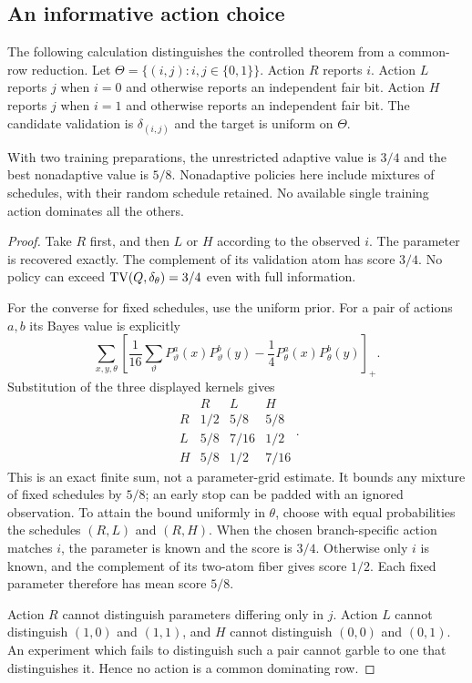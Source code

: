\subsection{An informative action choice}
The following calculation distinguishes the controlled theorem from a
common-row reduction. Let $\Theta=\{(i,j):i,j\in\{0,1\}\}$. Action
$R$ reports $i$. Action $L$ reports $j$ when $i=0$ and otherwise reports
an independent fair bit. Action $H$ reports $j$ when $i=1$ and otherwise
reports an independent fair bit. The candidate validation is
$\delta_{(i,j)}$ and the target is uniform on $\Theta$.

\begin{proposition}\label{prop:adaptive-gap}
With two training preparations, the unrestricted adaptive value is
$3/4$ and the best nonadaptive value is $5/8$. Nonadaptive policies here
include mixtures of schedules, with their random schedule retained.
No available single training action dominates all the others.
\end{proposition}
\begin{proof}
Take $R$ first, and then $L$ or $H$ according to the observed $i$.
The parameter is recovered exactly. The complement of its validation
atom has score $3/4$. No policy can exceed $\operatorname{TV}(Q,\delta_\theta)=3/4$
even with full information.

For the converse for fixed schedules, use the uniform prior. For a
pair of actions $a,b$ its Bayes value is explicitly
\begin{equation}\label{eq:adaptive-table-formula}
 \sum_{x,y,\theta}\left[
       \frac1{16}\sum_{\vartheta}P^a_\vartheta(x)P^b_\vartheta(y)
       -\frac14P^a_\theta(x)P^b_\theta(y)\right]_+.
\end{equation}
Substitution of the three displayed kernels gives
\[
\begin{array}{c|ccc}
 &R&L&H\\\hline
R&1/2&5/8&5/8\\
L&5/8&7/16&1/2\\
H&5/8&1/2&7/16
\end{array}.
\]
This is an exact finite sum, not a parameter-grid estimate. It bounds
any mixture of fixed schedules by $5/8$; an early stop can be padded
with an ignored observation. To attain the bound uniformly in $\theta$,
choose with equal probabilities the schedules $(R,L)$ and $(R,H)$.
When the chosen branch-specific action matches $i$, the parameter is
known and the score is $3/4$. Otherwise only $i$ is known, and the
complement of its two-atom fiber gives score $1/2$. Each fixed parameter
therefore has mean score $5/8$.

Action $R$ cannot distinguish parameters differing only in $j$.
Action $L$ cannot distinguish $(1,0)$ and $(1,1)$, and $H$ cannot
distinguish $(0,0)$ and $(0,1)$. An experiment which fails to distinguish
such a pair cannot garble to one that distinguishes it. Hence no action
is a common dominating row.
\end{proof}

